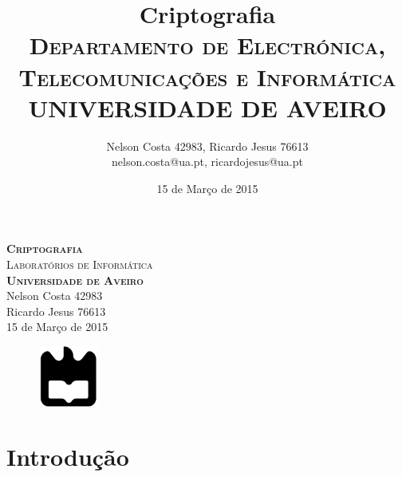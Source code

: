 \documentclass[a4paper,11pt,openright,oneside]{report}
\begin{document}
\begin{titlepage}
\begin{center}

{\vspace*{50mm}\textsc{\Huge\textbf{Criptografia}\\ \small{Laboratórios de Informática}}}\\[2cm]
{\textsc{\small\textbf{Universidade de Aveiro}}}\\[0.5cm]
{\small Nelson Costa 42983\\Ricardo Jesus 76613}\\[0.5cm]
{\small	15 de Março de 2015}\\

\begin{figure}[b]
\center
\graphicspath{}
\includegraphics[height=2cm, width=2cm]{ua.pdf}
\end{figure}

\end{center}

\end{titlepage}

\title{\textbf{Criptografia}\\[1cm]\textsc{\small {Departamento de Electrónica, Telecomunicações e Informática} \\ \large {UNIVERSIDADE DE AVEIRO}}}
\author{Nelson Costa 42983, Ricardo Jesus 76613\\nelson.costa@ua.pt, ricardojesus@ua.pt}
\date{15 de Março de 2015}

\maketitle


\begin{abstract}



\end{abstract}

\tableofcontents
\listoffigures

\clearpage
{}

\chapter{Introdução}
\label{chap.introdução}
\end{document}
